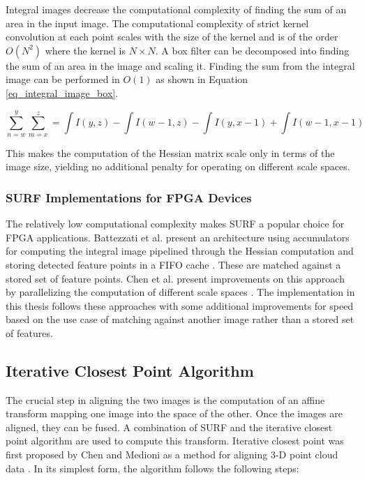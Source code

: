 \documentclass{article}
\begin{document}
Integral images decrease the computational complexity of finding the sum of an area in the input image. The computational complexity of strict kernel convolution at each point scales with the size of the kernel and is of the order $O(N^2)$ where the kernel is $N \times N$. A box filter can be decomposed into finding the sum of an area in the image and scaling it. Finding the sum from the integral image can be performed in $O(1)$ as shown in Equation \ref{eq_integral_image_box}. 

\begin{equation}
\sum\limits_{n=w}^y \sum\limits_{m=x}^z = \int I(y,z) - \int I(w-1,z) - \int I(y,x-1) + \int I(w-1, x-1)
\label{eq_integral_image_box}
\end{equation}

This makes the computation of the Hessian matrix scale only in terms of the image size, yielding no additional penalty for operating on different scale spaces.

\subsubsection{SURF Implementations for FPGA Devices}

The relatively low computational complexity makes SURF a popular choice for FPGA applications. Battezzati et al. present an architecture using accumulators for computing the integral image pipelined through the Hessian computation and storing detected feature points in a FIFO cache \cite{battezzati_surf_2012}. These are matched against a stored set of feature points. Chen et al. present improvements on this approach by parallelizing the computation of different scale spaces \cite{chen_fpga-based_2016}. The implementation in this thesis follows these approaches with some additional improvements for speed based on the use case of matching against another image rather than a stored set of features.

\subsection{Iterative Closest Point Algorithm}

The crucial step in aligning the two images is the computation of an affine transform mapping one image into the space of the other. Once the images are aligned, they can be fused. A combination of SURF and the iterative closest point algorithm are used to compute this transform. Iterative closest point was first proposed by Chen and Medioni as a method for aligning 3-D point cloud data \cite{chen_object_1992}. In its simplest form, the algorithm follows the following steps:
\end{document}
